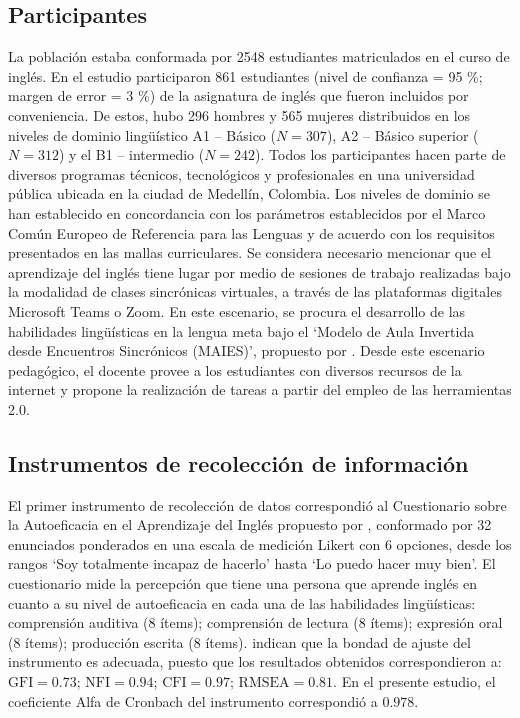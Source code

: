\documentclass[spanish]{textolivre}
\begin{document}
\subsection{Participantes}
La población estaba conformada por 2548 estudiantes matriculados en el curso de inglés. En el estudio participaron 861 estudiantes (nivel de confianza = 95 \%; margen de error = 3 \%) de la asignatura de inglés que fueron incluidos por conveniencia. De estos, hubo 296 hombres y 565 mujeres distribuidos en los niveles de dominio lingüístico A1 – Básico ($N = 307$), A2 – Básico superior ($N = 312$) y el B1 – intermedio ($N = 242$). Todos los participantes hacen parte de diversos programas técnicos, tecnológicos y profesionales en una universidad pública ubicada en la ciudad de Medellín, Colombia. Los niveles de dominio se han establecido en concordancia con los parámetros establecidos por el Marco Común Europeo de Referencia para las Lenguas \cite{consejo_de_europa_marco_nodate} y de acuerdo con los requisitos presentados en las mallas curriculares. Se considera necesario mencionar que el aprendizaje del inglés tiene lugar por medio de sesiones de trabajo realizadas bajo la modalidad de clases sincrónicas virtuales, a través de las plataformas digitales Microsoft Teams o Zoom.  En este escenario, se procura el desarrollo de las habilidades lingüísticas en la lengua meta bajo el ‘Modelo de Aula Invertida desde Encuentros Sincrónicos (MAIES)’, propuesto por \textcite{marshall_synchronous_2017}. Desde este escenario pedagógico, el docente provee a los estudiantes con diversos recursos de la internet y propone la realización de tareas a partir del empleo de las herramientas 2.0.

\subsection{Instrumentos de recolección de información}\label{sec-conduta}
El primer instrumento de recolección de datos correspondió al Cuestionario sobre la Autoeficacia en el Aprendizaje del Inglés propuesto por \textcite{wang_psychometric_2014}, conformado por 32 enunciados ponderados en una escala de medición Likert con 6 opciones, desde los rangos ‘Soy totalmente incapaz de hacerlo’ hasta ‘Lo puedo hacer muy bien’. El cuestionario mide la percepción que tiene una persona que aprende inglés en cuanto a su nivel de autoeficacia en cada una de las habilidades lingüísticas: comprensión auditiva (8 ítems); comprensión de lectura (8 ítems); expresión oral (8 ítems); producción escrita (8 ítems). \textcite{wang_psychometric_2014} indican que la bondad de ajuste del instrumento es adecuada, puesto que los resultados obtenidos correspondieron a: $\text{GFI} = \num{0,73}$; $\text{NFI} = \num{0,94}$; $\text{CFI} = \num{0,97}$; $\text{RMSEA} = \num{0,81}$. En el presente estudio, el coeficiente Alfa de Cronbach del instrumento correspondió a $\num{0,978}$. 
\end{document}
